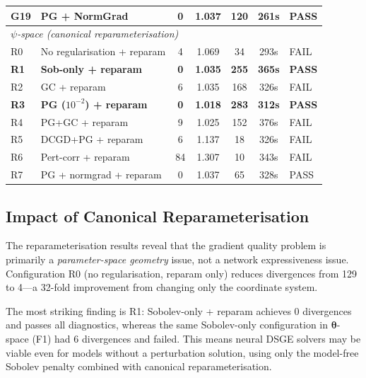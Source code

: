 \documentclass[11pt,a4paper]{article}
\theoremstyle{definition}
\newcommand{\btheta}{\boldsymbol{\theta}}
\begin{document}
\begin{table}[H]
\begin{tabular}{llccccl}
			G19 & PG + NormGrad & 0 & 1.037 & 120 & 261s & \textcolor{passgreen}{PASS} \\
			\midrule
			\multicolumn{7}{l}{\emph{$\psi$-space (canonical reparameterisation)}} \\
			R0 & No regularisation + reparam & 4 & 1.069 & 34 & 293s & \textcolor{failred}{FAIL} \\
			\rowcolor{green!10}
			\textbf{R1} & \textbf{Sob-only + reparam} & \textbf{0} & \textbf{1.035} & \textbf{255} & \textbf{365s} & \textbf{\textcolor{passgreen}{PASS}} \\
			R2 & GC + reparam & 6 & 1.035 & 168 & 326s & \textcolor{failred}{FAIL} \\
			\rowcolor{green!10}
			\textbf{R3} & \textbf{PG ($10^{-2}$) + reparam} & \textbf{0} & \textbf{1.018} & \textbf{283} & \textbf{312s} & \textbf{\textcolor{passgreen}{PASS}} \\
			R4 & PG+GC + reparam & 9 & 1.025 & 152 & 376s & \textcolor{failred}{FAIL} \\
			R5 & DCGD+PG + reparam & 6 & 1.137 & 18 & 326s & \textcolor{failred}{FAIL} \\
			R6 & Pert-corr + reparam & 84 & 1.307 & 10 & 343s & \textcolor{failred}{FAIL} \\
			\rowcolor{green!10}
			R7 & PG + normgrad + reparam & 0 & 1.037 & 65 & 328s & \textcolor{passgreen}{PASS} \\
			\bottomrule
		\end{tabular}
	\end{table}
	
	\subsection{Impact of Canonical Reparameterisation}
	
	The reparameterisation results reveal that the gradient quality problem is primarily a \emph{parameter-space geometry} issue, not a network expressiveness issue.
	Configuration R0 (no regularisation, reparam only) reduces divergences from 129 to 4---a 32-fold improvement from changing only the coordinate system.
	
	The most striking finding is R1: Sobolev-only + reparam achieves 0 divergences and passes all diagnostics, whereas the same Sobolev-only configuration in $\btheta$-space (F1) had 6 divergences and failed.
	This means neural DSGE solvers may be viable even for models without a perturbation solution, using only the model-free Sobolev penalty combined with canonical reparameterisation.
	
\end{document}
